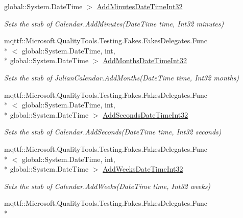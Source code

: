 \begin{DoxyCompactItemize}
global\-::\-System.\-Date\-Time $>$ \hyperlink{class_system_1_1_globalization_1_1_fakes_1_1_stub_julian_calendar_acae7efc06783e25cc45ff8a0c8921c39}{Add\-Minutes\-Date\-Time\-Int32}
\begin{DoxyCompactList}\small\item\em Sets the stub of Calendar.\-Add\-Minutes(\-Date\-Time time, Int32 minutes)\end{DoxyCompactList}\item 
mqttf\-::\-Microsoft.\-Quality\-Tools.\-Testing.\-Fakes.\-Fakes\-Delegates.\-Func\\*
$<$ global\-::\-System.\-Date\-Time, int, \\*
global\-::\-System.\-Date\-Time $>$ \hyperlink{class_system_1_1_globalization_1_1_fakes_1_1_stub_julian_calendar_a429934d9b3c0b6df0f21420426710764}{Add\-Months\-Date\-Time\-Int32}
\begin{DoxyCompactList}\small\item\em Sets the stub of Julian\-Calendar.\-Add\-Months(\-Date\-Time time, Int32 months)\end{DoxyCompactList}\item 
mqttf\-::\-Microsoft.\-Quality\-Tools.\-Testing.\-Fakes.\-Fakes\-Delegates.\-Func\\*
$<$ global\-::\-System.\-Date\-Time, int, \\*
global\-::\-System.\-Date\-Time $>$ \hyperlink{class_system_1_1_globalization_1_1_fakes_1_1_stub_julian_calendar_a09868f08cb4cd22cd8d55695b7ec2a10}{Add\-Seconds\-Date\-Time\-Int32}
\begin{DoxyCompactList}\small\item\em Sets the stub of Calendar.\-Add\-Seconds(\-Date\-Time time, Int32 seconds)\end{DoxyCompactList}\item 
mqttf\-::\-Microsoft.\-Quality\-Tools.\-Testing.\-Fakes.\-Fakes\-Delegates.\-Func\\*
$<$ global\-::\-System.\-Date\-Time, int, \\*
global\-::\-System.\-Date\-Time $>$ \hyperlink{class_system_1_1_globalization_1_1_fakes_1_1_stub_julian_calendar_a42a0e6b24848fb845b97b05bd5569b4c}{Add\-Weeks\-Date\-Time\-Int32}
\begin{DoxyCompactList}\small\item\em Sets the stub of Calendar.\-Add\-Weeks(\-Date\-Time time, Int32 weeks)\end{DoxyCompactList}\item 
mqttf\-::\-Microsoft.\-Quality\-Tools.\-Testing.\-Fakes.\-Fakes\-Delegates.\-Func\\*

\end{DoxyCompactItemize}
